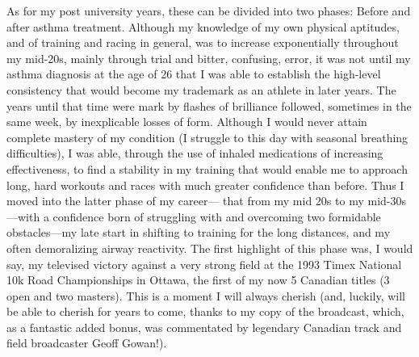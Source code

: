 As for my post university years, these can be divided into two phases: Before and after asthma treatment. Although my knowledge of my own physical aptitudes, and of training and racing in general, was to increase exponentially throughout my mid-20s, mainly through trial and bitter, confusing, error, it was not until my asthma diagnosis at the age of 26 that I was able to establish the high-level consistency that would become my trademark as an athlete in later years. The years until that time were mark by flashes of brilliance followed, sometimes in the same week, by inexplicable losses of form. Although I would never attain complete mastery of my condition (I struggle to this day with seasonal breathing difficulties), I was able, through the use of inhaled medications of increasing effectiveness, to find a stability in my training that would enable me to approach long, hard workouts and races with much greater confidence than before. Thus I moved into the latter phase of my career— that from my mid 20s to my mid-30s—with a confidence born of struggling with and overcoming two formidable obstacles—my late start in shifting to training for the long distances, and my often demoralizing airway reactivity. The first highlight of this phase was, I would say, my televised victory against a very strong field at the 1993 Timex National 10k Road Championships in Ottawa, the first of my now 5 Canadian titles (3 open and two masters). This is a moment I will always cherish (and, luckily, will be able to cherish for years to come, thanks to my copy of the broadcast, which, as a fantastic added bonus, was commentated by legendary Canadian track and field broadcaster Geoff Gowan!).


